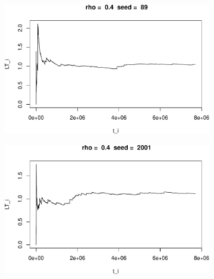 \documentclass[]{article}
\begin{document}
\begin{figure}[h!]
\begin{subfigure}[b]{.55\linewidth}
\includegraphics[width=\linewidth]{003_files/figure-latex/unnamed-chunk-14-7.pdf}
\end{subfigure}\hfill
\begin{subfigure}[b]{.55\linewidth}
\includegraphics[width=\linewidth]{003_files/figure-latex/unnamed-chunk-14-8.pdf}
\end{subfigure}\vfill
\end{figure}
\end{document}
